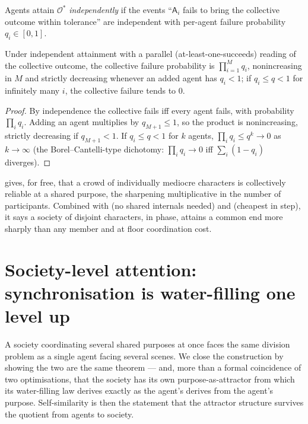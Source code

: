 \documentclass[11pt,twocolumn,a4paper]{article}
\newcommand{\Agent}{\mathsf{A}}
\newcommand{\Out}{\mathcal{O}}       %
\begin{document}
\begin{definition}
\label{def:indep}
Agents attain $\Out^\ast$ \emph{independently} if the events ``$\Agent_i$
fails to bring the collective outcome within tolerance'' are independent
with per-agent failure probability $q_i\in[0,1]$.
\end{definition}

\begin{theorem}
\label{thm:crowd}
Under independent attainment with a parallel (at-least-one-succeeds)
reading of the collective outcome, the collective failure probability is
$\prod_{i=1}^M q_i$, nonincreasing in $M$ and strictly decreasing whenever
an added agent has $q_i<1$; if $q_i\le q<1$ for infinitely many $i$, the
collective failure tends to $0$.
\end{theorem}

\begin{proof}
By independence the collective fails iff every agent fails, with
probability $\prod_i q_i$. Adding an agent multiplies by $q_{M+1}\le1$, so
the product is nonincreasing, strictly decreasing if $q_{M+1}<1$. If
$q_i\le q<1$ for $k$ agents, $\prod_i q_i\le q^k\to0$ as $k\to\infty$
(the Borel--Cantelli-type dichotomy: $\prod_i q_i\to0$ iff
$\sum_i(1-q_i)$ diverges).
\end{proof}

\begin{remark}
\label{rem:emergent}
 gives, for free, that a crowd of individually mediocre
characters is collectively reliable at a shared purpose, the sharpening
multiplicative in the number of participants. Combined with
 (no shared internals needed) and 
(cheapest in step), it says a society of disjoint characters, in phase,
attains a common end more sharply than any member and at floor
coordination cost.
\end{remark}

\section{Society-level attention: synchronisation is water-filling one
level up}
\label{sec:society-attention}

A society coordinating several shared purposes at once faces the same
division problem as a single agent facing several scenes. We close the
construction by showing the two are the same theorem --- and, more than a
formal coincidence of two optimisations, that the society has its own
purpose-as-attractor from which its water-filling law derives exactly as
the agent's derives from the agent's purpose. Self-similarity is then the
statement that the attractor structure survives the quotient from agents to
society.
\end{document}
